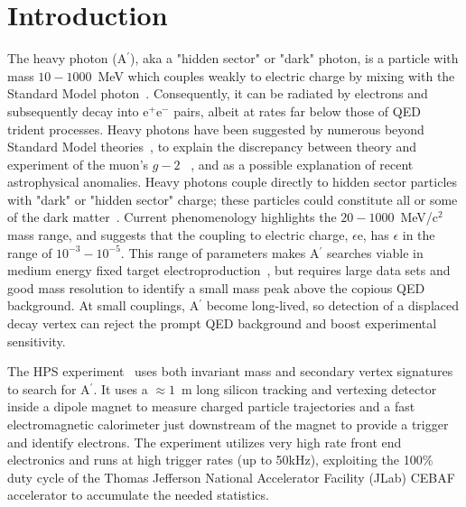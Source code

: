 \documentclass[final,3p,times,twocolumn]{elsarticle}
\newcommand{\Aprime}{A\ensuremath{^\prime}}
\newcommand{\ee}{e$^+$e$^-$}
\begin{document}
\clearpage
\tableofcontents
\clearpage
\newpage
\newpage


\section{Introduction}
\label{introduction}
The heavy photon (\Aprime{}), aka a "hidden sector" or "dark" photon, is a particle with mass 
$10-1000$~MeV which couples weakly to electric charge by mixing with the Standard Model 
photon~\cite{Holdom:1985ag}. Consequently, it can be radiated by electrons and subsequently decay 
into \ee{} pairs, albeit at rates far below those of QED trident processes. Heavy photons have been 
suggested by numerous beyond Standard Model theories~\cite{Essig:2013lka}, to explain the 
discrepancy 
between theory and experiment of the muon's $g-2$ ~\cite{Pospelov:2008zw}, and as a possible 
explanation of recent astrophysical anomalies.  Heavy photons  couple directly to  hidden sector 
particles with "dark" or "hidden sector" charge; these particles
could constitute all or some of the dark matter~\cite{ArkaniHamed:2008qn}. 
Current phenomenology highlights the $20-1000$~MeV/c$^{2}$ mass range, and 
suggests that  the coupling to electric charge, $\epsilon$e, has $\epsilon$ in the range of 
$10^{-3} -10^{-5}$. This range of parameters makes \Aprime{} searches viable in 
medium energy fixed target electroproduction~\cite{Bjorken:2009mm}, but requires large data sets and 
good mass resolution to identify a small mass peak above the copious QED background. At small 
couplings, \Aprime{} become long-lived, so detection of a displaced decay vertex can reject the prompt 
QED background and boost experimental sensitivity.  

The HPS experiment~\cite{HPS_proposal_2010} uses both invariant mass and secondary
vertex signatures to search for \Aprime{}. It uses  a $\approx 1$~m long silicon tracking and vertexing detector
inside a dipole magnet to measure charged particle trajectories and a fast electromagnetic calorimeter 
just downstream of the magnet to provide a trigger and identify electrons. The experiment utilizes very 
high rate front end electronics and runs at high trigger rates (up to 50kHz), exploiting the 100\% duty 
cycle of the Thomas Jefferson National Accelerator Facility (JLab) CEBAF accelerator to accumulate 
the needed statistics. 
\end{document}
